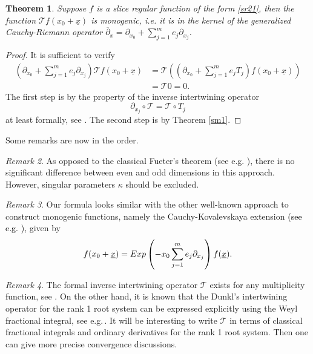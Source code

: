 \documentclass{amsart}
\newtheorem{theorem}{Theorem}[section]
\theoremstyle{definition}
\theoremstyle{remark}
\newtheorem{remark}[theorem]{Remark}
\numberwithin{equation}{section}
\begin{document}
\begin{theorem} \label{sd} Suppose $f$ is a slice regular function of the form \eqref{sr21}, then the function $\mathcal{T}f(x_{0}+\underline{x})$
is monogenic, i.e. it is in the kernel of the generalized Cauchy-Riemann operator $\overline{\partial}_{x}=\partial_{x_{0}}+\sum_{j=1}^{m}e_{j}\partial_{x_{j}}$.
\end{theorem}
\begin{proof} It is sufficient to verify
\begin{equation*}
\begin{split}
     \left(\partial_{x_{0}}+\sum_{j=1}^{m}e_{j}\partial_{x_{j}}\right) \mathcal{T}f(x_{0}+\underline{x})&= \mathcal{T}\left( \left(\partial_{x_{0}}+\sum_{j=1}^{m}e_{j}T_{j}\right) f(x_{0}+\underline{x})\right)\\
     &=\mathcal{T} 0=0.
\end{split}
\end{equation*}
The first step is by the property of the inverse intertwining operator
\begin{equation*}
    \partial_{x_j}\circ \mathcal{T}=\mathcal{T} \circ T_{j}
\end{equation*}
at least formally, see \cite[Proposition 6.5.2]{dx1}.
The second step is by Theorem  \ref{sm1}.
\end{proof}
Some remarks are now in the order.
\begin{remark} As opposed to the classical Fueter's theorem (see e.g. \cite{ qian, sce}), there is no significant difference between even and odd dimensions in this approach. However, singular parameters $\kappa$ should be excluded.
\end{remark}
\begin{remark} Our formula looks similar with the other well-known approach to construct monogenic functions, namely the
Cauchy-Kovalevskaya extension \textcolor{black}{(see e.g. \cite[Theorem 2]{deso})}, given by
\begin{equation*}
    f(x_{0}+\underline{x})={\rm Exp}\left(-x_{0} \sum_{j=1}^{m}e_{j}\partial_{x_j}\right)f(\underline{x}).
\end{equation*}
\end{remark}
\begin{remark} The formal inverse intertwining operator $\mathcal{T}$ exists for any multiplicity function, see \cite{dx1}.
On the other hand, it is known that the Dunkl's intertwining operator for the rank 1 root system can be expressed explicitly using the Weyl fractional integral, see e.g.\,\cite{dl, dx1}. It will be interesting to write $\mathcal{T}$ in terms of classical fractional integrals and ordinary derivatives for the rank 1 root system.
Then one can give more precise convergence discussions.
\end{remark}
\end{document}
